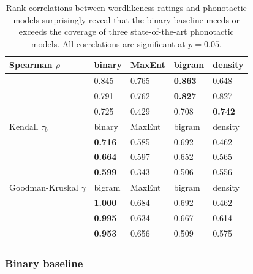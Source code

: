 \begin{table} \label{cor}
\centering
\begin{tabular}{l l l l l}
\toprule
Spearman $\rho$          & binary           & MaxEnt  & bigram           & density          \\
\midrule
\citealt{Greenberg1964}  & {0.845}          & {0.765} & {\textbf{0.863}} & {0.648}          \\
\citealt{Scholes1966}    & {0.791}          & {0.762} & {\textbf{0.827}} & {0.827}          \\
\citealt{Albright2003b}  & {0.725}          & {0.429} & {0.708}          & {\textbf{0.742}} \\
\midrule
Kendall $\tau_b$         & binary           & MaxEnt  & bigram           & density          \\
\midrule
\citealt{Greenberg1964}  & {\textbf{0.716}} & {0.585} & {0.692}          & {0.462}          \\
\citealt{Scholes1966}    & {\textbf{0.664}} & {0.597} & {0.652}          & {0.565}          \\
\citealt{Albright2003b}  & {\textbf{0.599}} & {0.343} & {0.506}          & {0.556}          \\
\midrule
Goodman-Kruskal $\gamma$ & bigram           & MaxEnt  & bigram           & density          \\
\midrule
\citealt{Greenberg1964}  & {\textbf{1.000}} & {0.684} & {0.692}          & {0.462}          \\
\citealt{Scholes1966}    & {\textbf{0.995}} & {0.634} & {0.667}          & {0.614}          \\
\citealt{Albright2003b}  & {\textbf{0.953}} & {0.656} & {0.509}          & {0.575}          \\
\bottomrule
\end{tabular}
\caption{Rank correlations between wordlikeness ratings and phonotactic models surprisingly reveal that the binary baseline meeds or exceeds the coverage of three state-of-the-art phonotactic models. All correlations are significant at $p = 0.05$.}
\end{table}

\subsubsection{Binary baseline}

